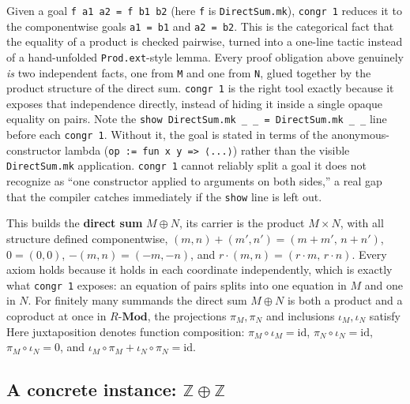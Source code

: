 Given a goal \texttt{f a1 a2 = f b1 b2} (here \texttt{f} is \texttt{DirectSum.mk}), \texttt{congr 1} reduces it to the componentwise goals \texttt{a1 = b1} and \texttt{a2 = b2}. This is the categorical fact that the equality of a product is checked pairwise, turned into a one-line tactic instead of a hand-unfolded \texttt{Prod.ext}-style lemma. Every proof obligation above genuinely \emph{is} two independent facts, one from \texttt{M} and one from \texttt{N}, glued together by the product structure of the direct sum. \texttt{congr 1} is the right tool exactly because it exposes that independence directly, instead of hiding it inside a single opaque equality on pairs. Note the \texttt{show DirectSum.mk \_\allowbreak{} \_\allowbreak{} = DirectSum.mk \_\allowbreak{} \_\allowbreak{}} line before each \texttt{congr 1}. Without it, the goal is stated in terms of the anonymous-constructor lambda (\texttt{op := fun x y => ⟨...⟩}) rather than the visible \texttt{DirectSum.mk} application. \texttt{congr 1} cannot reliably split a goal it does not recognize as ``one constructor applied to arguments on both sides,'' a real gap that the compiler catches immediately if the \texttt{show} line is left out.

\begin{mathreading}

This builds the \textbf{direct sum} \(M \oplus N\), its carrier is the product \(M \times N\), with all structure defined componentwise, \((m,n) + (m',n') = (m+m',\, n+n')\), \(0 = (0,0)\), \(-(m,n) =
(-m,-n)\), and \(r\cdot(m,n) = (r\cdot m,\, r\cdot n)\). Every axiom holds because it holds in each coordinate independently, which is exactly what \texttt{congr 1} exposes: an equation of pairs splits into one equation in \(M\) and one in \(N\). For finitely many summands the direct sum \(M \oplus N\) is both a product and a coproduct at once in \(R\text{-}\mathbf{Mod}\), the projections \(\pi_M, \pi_N\) and inclusions \(\iota_M, \iota_N\) satisfy Here juxtaposition denotes function composition: \(\pi_M \circ \iota_M = \mathrm{id}\), \(\pi_N \circ \iota_N = \mathrm{id}\), \(\pi_M \circ \iota_N =
0\), and \(\iota_M \circ \pi_M + \iota_N \circ \pi_N = \mathrm{id}\).

\end{mathreading}

\begin{center}

\end{center}

\subsection{\texorpdfstring{A concrete instance: \(\mathbb{Z} \oplus \mathbb{Z}\)}{A concrete instance: \textbackslash mathbb\{Z\} \textbackslash oplus \textbackslash mathbb\{Z\}}}\label{sec:11-modules:06-direct-sums:2}

